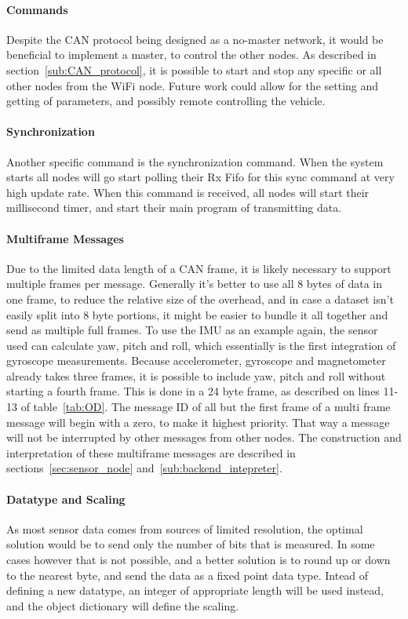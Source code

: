 \paragraph*{Commands}
Despite the CAN protocol being designed as a no-master network, it would be beneficial to implement a master, to control the other nodes. 
As described in section~\ref{sub:CAN_protocol}, it is possible to start and stop any specific or all other nodes from the WiFi node.
Future work could allow for the setting and getting of parameters, and possibly remote controlling the vehicle.

\paragraph*{Synchronization}
Another specific command is the synchronization command. 
When the system starts all nodes will go start polling their Rx Fifo for this sync command at very high update rate. 
When this command is received, all nodes will start their millisecond timer, and start their main program of transmitting data.

\paragraph*{Multiframe Messages}
Due to the limited data length of a CAN frame, it is likely necessary to support multiple frames per message. 
Generally it's better to use all 8 bytes of data in one frame, to reduce the relative size of the overhead, and in case a dataset isn't easily split into 8 byte portions, it might be easier to bundle it all together and send as multiple full frames. 
To use the IMU as an example again, the sensor used can calculate yaw, pitch and roll, which essentially is the first integration of gyroscope measurements. 
Because accelerometer, gyroscope and magnetometer already takes three frames, it is possible to include yaw, pitch and roll without starting a fourth frame.
This is done in a 24 byte frame, as described on lines 11-13 of table~\ref{tab:OD}. 
The message ID of all but the first frame of a multi frame message will begin with a zero, to make it highest priority.
That way a message will not be interrupted by other messages from other nodes.
The construction and interpretation of these multiframe messages are described in sections~\ref{sec:sensor_node} and~\ref{sub:backend_intepreter}.

\paragraph*{Datatype and Scaling}
As most sensor data comes from sources of limited resolution, the optimal solution would be to send only the number of bits that is measured. 
In some cases however that is not possible, and a better solution is to round up or down to the nearest byte, and send the data as a fixed point data type.
Intead of defining a new datatype, an integer of appropriate length will be used instead, and the object dictionary will define the scaling. \\

